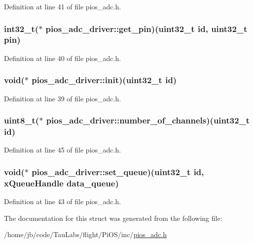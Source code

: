 \-Definition at line 41 of file pios\-\_\-adc.\-h.

\hypertarget{structpios__adc__driver_ad310fb99761e7717588d465bf65db8de}{
\subsubsection[{get\-\_\-pin}]{\setlength{\rightskip}{0pt plus 5cm}int32\-\_\-t($\ast$ {\bf pios\-\_\-adc\-\_\-driver\-::get\-\_\-pin})(uint32\-\_\-t {\bf id}, uint32\-\_\-t pin)}}\label{structpios__adc__driver_ad310fb99761e7717588d465bf65db8de}


\-Definition at line 40 of file pios\-\_\-adc.\-h.

\hypertarget{structpios__adc__driver_aaea796c74764bf59704fb8b2714bcf3b}{
\subsubsection[{init}]{\setlength{\rightskip}{0pt plus 5cm}void($\ast$ {\bf pios\-\_\-adc\-\_\-driver\-::init})(uint32\-\_\-t {\bf id})}}\label{structpios__adc__driver_aaea796c74764bf59704fb8b2714bcf3b}


\-Definition at line 39 of file pios\-\_\-adc.\-h.

\hypertarget{structpios__adc__driver_a3d56e6c3f7a8a40265cc5a685fb1debc}{
\subsubsection[{number\-\_\-of\-\_\-channels}]{\setlength{\rightskip}{0pt plus 5cm}uint8\-\_\-t($\ast$ {\bf pios\-\_\-adc\-\_\-driver\-::number\-\_\-of\-\_\-channels})(uint32\-\_\-t {\bf id})}}\label{structpios__adc__driver_a3d56e6c3f7a8a40265cc5a685fb1debc}


\-Definition at line 45 of file pios\-\_\-adc.\-h.

\hypertarget{structpios__adc__driver_a126055ec2d326eeb21161f08d30bf395}{
\subsubsection[{set\-\_\-queue}]{\setlength{\rightskip}{0pt plus 5cm}void($\ast$ {\bf pios\-\_\-adc\-\_\-driver\-::set\-\_\-queue})(uint32\-\_\-t {\bf id}, x\-Queue\-Handle data\-\_\-queue)}}\label{structpios__adc__driver_a126055ec2d326eeb21161f08d30bf395}


\-Definition at line 43 of file pios\-\_\-adc.\-h.



\-The documentation for this struct was generated from the following file\-:\begin{DoxyCompactItemize}
\item 
/home/jb/code/\-Tau\-Labs/flight/\-Pi\-O\-S/inc/\hyperlink{pios__adc_8h}{pios\-\_\-adc.\-h}\end{DoxyCompactItemize}
